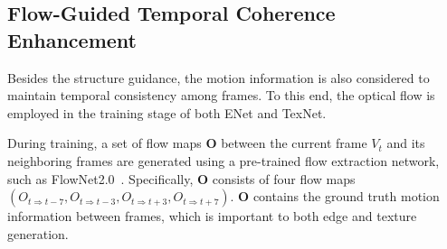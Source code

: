 \subsection{Flow-Guided Temporal Coherence Enhancement}
\label{sec:fec}
Besides the structure guidance, the motion information is also considered to maintain temporal consistency among frames.
To this end, the optical flow is employed in the training stage of both ENet and TexNet.
%

During training, a set of flow maps \(\boldsymbol{O}\) between the current frame $V_t$ and its neighboring frames are generated using a pre-trained flow extraction network, such as FlowNet2.0~\cite{Flownet_2017_CVPR}.
Specifically, \(\boldsymbol{O}\) consists of four flow maps \((O_{t\Rightarrow t-7}, O_{t\Rightarrow t-3}, O_{t\Rightarrow t+3}, O_{t\Rightarrow t+7})\).
\(\boldsymbol{O}\) contains the ground truth motion information between frames, which is important to both edge and texture generation.




